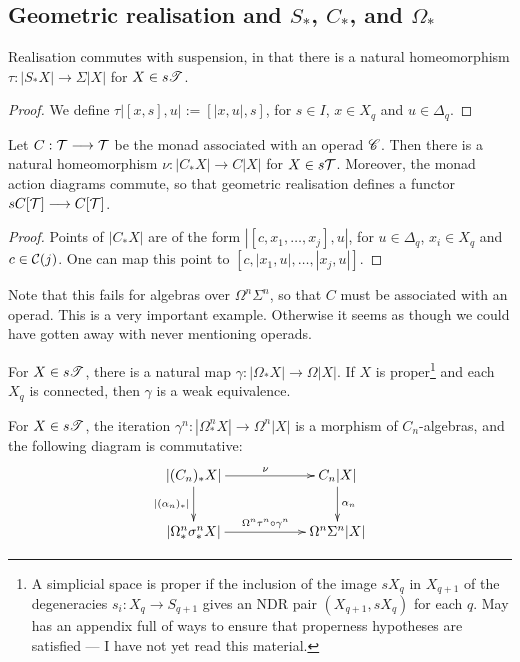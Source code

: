 \documentclass[11pt]{article}
\begin{document}
\begin{chapter10-12}
\section{Geometric realisation and $S_*$, $C_*$, and $\Omega_*$}
\begin{thm*}[12.1]
Realisation commutes with suspension, in that there is a natural homeomorphism $\tau:|S_*X|\to\Sigma |X|$ for $X\in s\mathscr{T}$.
\end{thm*}
\begin{proof}
We define $\tau|[x,s],u|:=[|x,u|,s]$, for $s\in I$, $x\in X_q$ and $u\in\Delta_q$.
\end{proof}

\begin{thm*}[12.2]
Let $C:\mathcal{T}\longrightarrow\mathcal{T}$ be the monad associated with an operad $\mathscr{C}$. Then there is a natural homeomorphism $\nu:|C_*X|\to C|X|$ for $X\in s\mathcal{T}$. Moreover, the monad action diagrams commute, so that geometric realisation defines a functor $sC[\mathcal{T}]\longrightarrow C[\mathcal{T}]$.
\end{thm*}
\begin{proof}
Points of $|C_*X|$ are of the form $|[c,x_1,\ldots,x_j],u|$, for $u\in\Delta_q$, $x_i\in X_q$ and $c\in\mathcal{C}(j)$. One can map this point to $[c,|x_1,u|,\ldots,|x_j,u|]$.
\end{proof}
\noindent Note that this fails for algebras over $\Omega^n\Sigma^n$, so that $C$ must be associated with an operad. This is a very important example. Otherwise it seems as though we could have gotten away with never mentioning operads.
\begin{thm*}[12.3]
For $X\in s\mathscr{T}$, there is a natural map $\gamma:|\Omega_*X|\to\Omega|X|$. If $X$ is proper\footnote{A simplicial space is proper if the inclusion of the image $sX_q$ in $X_{q+1}$ of the degeneracies $s_i:X_q\to S_{q+1}$ gives an NDR pair $(X_{q+1},sX_q)$ for each $q$. May has an appendix full of ways to ensure that properness hypotheses are satisfied --- I have not yet read this material.} and each $X_q$ is connected, then $\gamma$ is a weak equivalence.
\end{thm*}
\begin{thm*}[12.4]
For $X\in s\mathscr{T}$, the iteration $\gamma^n:|\Omega^n_*X|\to\Omega^n|X|$ is a morphism of $C_n$-algebras, and the following diagram is commutative:
\[\xymatrix@C=2cm{
|(C_n)_*X|\ar[r]^{\nu}\ar[d]_{|(\alpha_n)_*|}&C_n|X|\ar[d]^{\alpha_n}\\
|\Omega^n_*\sigma^n_*X|\ar[r]^{\Omega^n\tau^n\circ\gamma^n}&\Omega^n\Sigma^n|X|
}\]

\end{thm*}

\end{chapter10-12}
\end{document}
